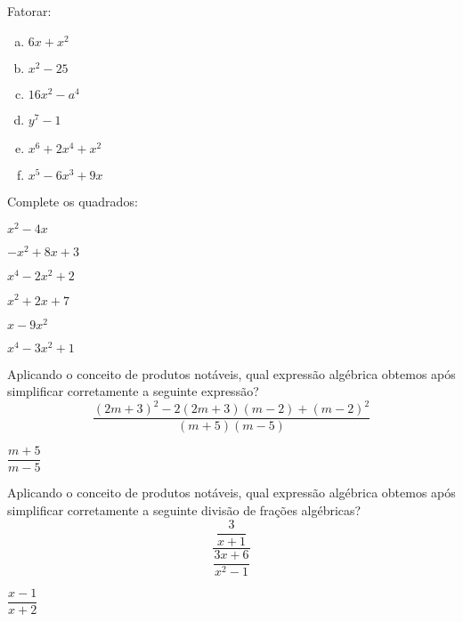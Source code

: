 \newpage
\begin{secExercicios}

\begin{exer}
    Fatorar:
    \begin{multicols}{2}
        \begin{enumerate}[a)]
            \item $6x+x^2$
            \item $x^2-25$
            \item $16x^2-a^4$
            \item $y^7-1$
            \item $x^6+2x^4+x^2$
            \item $x^5-6x^3+9x$
        \end{enumerate}
    \end{multicols}
\end{exer}

\begin{exer}
  Complete os quadrados:
  \begin{enumerate}[a)]\begin{multicols}{2}
    \item $x^2-4x$
    \item $-x^2+8x+3$
    \item $x^4-2x^2+2$
    \item $x^2+2x+7$
    \item $x-9x^2$
    \item $x^4-3x^2+1$
    \end{multicols}\end{enumerate}
\end{exer}

\begin{exer}
Aplicando o conceito de produtos notáveis, qual expressão algébrica obtemos após simplificar corretamente a seguinte expressão?
\[\dfrac{(2m+3)^2-2(2m+3)(m-2)+(m-2)^2}{(m+5)(m-5)}\]
\end{exer}
\begin{resp}
 $\dfrac{m+5}{m-5}$
\end{resp}

\begin{exer}
Aplicando o conceito de produtos notáveis, qual expressão algébrica obtemos após simplificar corretamente a seguinte divisão de frações algébricas?
\[\dfrac{\dfrac{3}{x+1}}{\dfrac{3x+6}{x^2-1}}\]
\end{exer}
\begin{resp}
 $\dfrac{x-1}{x+2}$
\end{resp}


\end{secExercicios}
